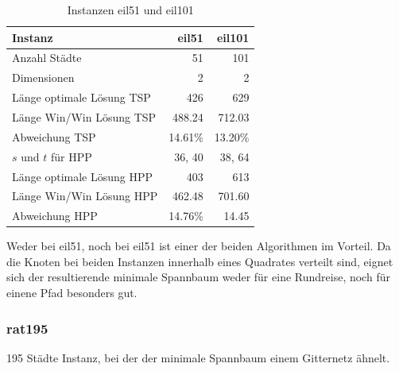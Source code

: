 \documentclass[11pt,a4paper]{article}
\begin{document}
\begin{table}[H]
        \centering
        \begin{tabular}{| l | r | r |}
            \hline
                Instanz                     & \textbf{eil51}
                                            & \textbf{eil101} \\ \hline
                Anzahl Städte               & 51        & 101       \\ \hline
                Dimensionen                 & 2         & 2         \\ \hline
                Länge optimale Lösung TSP   & 426       & 629       \\ \hline
                Länge Win/Win Lösung  TSP   & 488.24    & 712.03    \\ \hline
                Abweichung TSP              & 14.61\%   & 13.20\%   \\ \hline
                $s$ und $t$ für HPP         & 36, 40    & 38, 64    \\ \hline
                Länge optimale Lösung HPP   & 403       & 613       \\ \hline
                Länge Win/Win Lösung  HPP   & 462.48    & 701.60    \\ \hline
                Abweichung HPP              & 14.76\%   & 14.45     \\ \hline
        \end{tabular}
        \caption{Instanzen eil51 und eil101}
        \label{tab:instanzen_eil}
\end{table}

Weder bei eil51, noch bei eil51 ist einer der beiden Algorithmen im Vorteil. Da die Knoten bei beiden Instanzen innerhalb eines Quadrates verteilt sind, eignet sich der resultierende minimale Spannbaum weder für eine Rundreise, noch für einene Pfad besonders gut.

\subsubsection{rat195}
195 Städte Instanz, bei der der minimale Spannbaum einem Gitternetz ähnelt.
\end{document}
